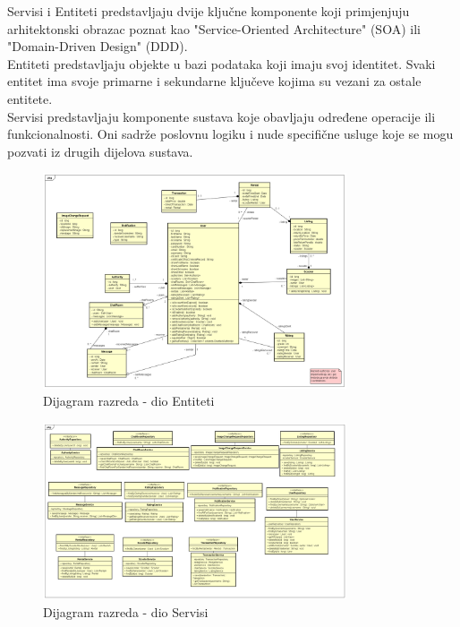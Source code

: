 			\indent Servisi i Entiteti predstavljaju dvije ključne komponente koji primjenjuju arhitektonski obrazac poznat kao "Service-Oriented Architecture" (SOA) ili "Domain-Driven Design" (DDD). \\
			
			 \indent Entiteti predstavljaju objekte u bazi podataka koji imaju svoj identitet. Svaki entitet ima svoje primarne i sekundarne ključeve kojima su vezani za ostale entitete. \\
			 
			 \indent Servisi predstavljaju komponente sustava koje obavljaju određene operacije ili funkcionalnosti. Oni sadrže poslovnu logiku i nude specifične usluge koje se mogu pozvati iz drugih dijelova sustava. \\
			 
			\begin{figure}[H]
				\centering
				\includegraphics[width=0.8\textwidth]{dijagrami/entiteti.png}
				\caption{Dijagram razreda - dio Entiteti}
				\label{fig:your_label}
			\end{figure}
			
			\begin{figure}[H]
				\centering
				\includegraphics[width=0.8\textwidth]{dijagrami/servisi.png}
				\caption{Dijagram razreda - dio Servisi}
				\label{fig:your_label}
			\end{figure}
			
